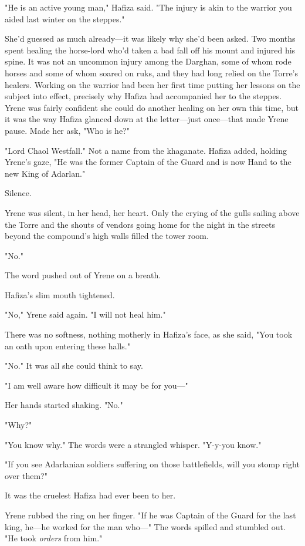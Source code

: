 "He is an active young man," Hafiza said. "The injury is akin to the warrior you aided last winter on the steppes."

She'd guessed as much already---it was likely why she'd been asked. Two months spent healing the horse-lord who'd taken a bad fall off his mount and injured his spine. It was not an uncommon injury among the Darghan, some of whom rode horses and some of whom soared on ruks, and they had long relied on the Torre's healers. Working on the warrior had been her first time putting her lessons on the subject into effect, precisely why Hafiza had accompanied her to the steppes. Yrene was fairly confident she could do another healing on her own this time, but it was the way Hafiza glanced down at the letter---just once---that made Yrene pause. Made her ask, "Who is he?"

"Lord Chaol Westfall." Not a name from the khaganate. Hafiza added, holding Yrene's gaze, "He was the former Captain of the Guard and is now Hand to the new King of Adarlan." 

Silence.

Yrene was silent, in her head, her heart. Only the crying of the gulls sailing above the Torre and the shouts of vendors going home for the night in the streets beyond the compound's high walls filled the tower room.

"No."

The word pushed out of Yrene on a breath.

Hafiza's slim mouth tightened.

"No," Yrene said again. "I will not heal him."

There was no softness, nothing motherly in Hafiza's face, as she said, "You took an oath upon entering these halls."

"No." It was all she could think to say.

"I am well aware how difficult it may be for you---"

Her hands started shaking. "No."

"Why?"

"You know why." The words were a strangled whisper. "Y-y-you know."

"If you see Adarlanian soldiers suffering on those battlefields, will you stomp right over them?"

It was the cruelest Hafiza had ever been to her.

Yrene rubbed the ring on her finger. "If he was Captain of the Guard for the last king, he---he worked for the man who---" The words spilled and stumbled out. "He took \emph{orders} from him."

